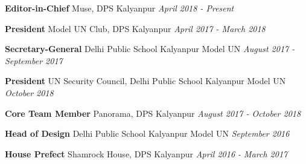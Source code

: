 \documentclass[letterpaper,11pt]{article}
\begin{document}
        \vspace{-1mm}
        
        \item \textbf{Editor-in-Chief} {\color{darkGray}Muse, DPS Kalyanpur}
            \hfill\textit{\color{lightGray}April 2018 - Present}\\
            
        \vspace{-1mm}
        
        \item \textbf{President} {\color{darkGray}Model UN Club, DPS Kalyanpur}
            \hfill\textit{\color{lightGray}April 2017 - March 2018}\\
            
        \vspace{-1mm}
  
        \item \textbf{Secretary-General }
            {\color{darkGray}Delhi Public School Kalyanpur Model UN}
            \hfill\textit{\color{lightGray}August 2017 - September 2017}\\
            
        \vspace{-1mm}
  
        \item \textbf{President} {\color{darkGray}UN Security Council, Delhi Public School Kalyanpur Model UN}
            \hfill\textit{\color{lightGray}October 2018}\\
            
        \vspace{-1mm}
  
        \item \textbf{Core Team Member} {\color{darkGray}Panorama, DPS Kalyanpur}
            \hfill\textit{\color{lightGray}August 2017 - October 2018}\\
            
        \vspace{-1mm}
  
        \item \textbf{Head of Design} {\color{darkGray}Delhi Public School Kalyanpur Model UN}
            \hfill\textit{\color{lightGray}September 2016}\\
            
        \vspace{-1mm}
        
        \item \textbf{House Prefect} {\color{darkGray}Shamrock House, DPS Kalyanpur}
            \hfill\textit{\color{lightGray}April 2016 - March 2017}\\
            
\end{document}
